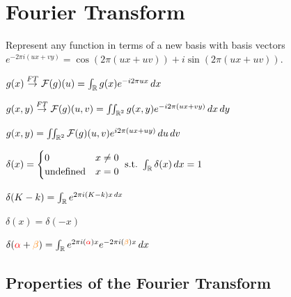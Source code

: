 \section{Fourier Transform}
Represent any function in terms of a new basis with basis vectors \(e^{-2\pi i(ux + vy)} = \cos(2\pi(ux + uv)) + i \sin(2\pi(ux + uv))\).

\begin{definition}[1D-FT]
  \(g(x) \overset{FT}{\to} \operatorname{\mathcal{F}}(g)(u) = \int_{\operatorname{\mathbb{R}}} g(x) e^{-i2\pi ux} \, dx\)
\end{definition}

\begin{definition}[2D-FT]
  \(g(x, y) \overset{FT}{\to} \operatorname{\mathcal{F}}(g)(u, v) = \iint_{\operatorname{\mathbb{R}}^2} g(x, y) e^{-i2\pi (ux + vy)} \,dx \,dy\)
\end{definition}

\begin{definition}[Inverse FT]
  \(g(x, y) = \iint_{\operatorname{\mathbb{R}}^2} \operatorname{\mathcal{F}}(g)(u, v) e^{i2\pi(ux + uy)} \,du \,dv\)
\end{definition}

\begin{definition}
  \(\delta(x) = \begin{cases}
    0 & x \neq 0 \\
    \text{undefined} & x = 0
  \end{cases} \ \text{s.t.} \ \int_{\operatorname{\mathbb{R}}} \delta(x) \,dx = 1\)
\end{definition}

\begin{theorem}
  \begin{itemize*}
    \item \(\delta(K - k) = \int_{\operatorname{\mathbb{R}}} e^{2 \pi i (K - k)x \,dx}\)
    \item \(\delta(x) = \delta(-x)\) \\
    \item \(\delta({\color{red} \alpha} + {\color{orange} \beta}) = \int_{\operatorname{\mathbb{R}}}e^{2 \pi i ({\color{red}\alpha}) x} e^{-2\pi i({\color{orange}\beta})x}\, dx\)
  \end{itemize*}
\end{theorem}

\begin{definition}
\end{definition}

\subsection{Properties of the Fourier Transform}

